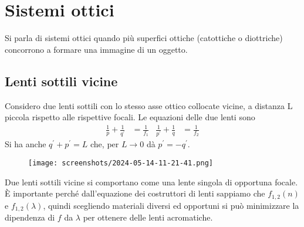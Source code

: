 \section{Sistemi ottici}
Si parla di sistemi ottici quando più superfici ottiche (catottiche o diottriche) concorrono a formare una immagine di un oggetto.

\subsection{Lenti sottili vicine}
Considero due lenti sottili con lo stesso asse ottico collocate vicine, a distanza L piccola rispetto alle rispettive focali. Le equazioni delle due lenti sono
\begin{align}
	\frac{1}{p}+\frac{1}{q^{\prime} } &= \frac{1}{f_1}
	&
	\frac{1}{p^{\prime} } + \frac{1}{q} &= \frac{1}{f_2}
\end{align}
Si ha anche \(q^{\prime} +p^{\prime} =L\) che, per \(L\to 0\) dà \(p^{\prime} = -q^{\prime} \).
\begin{figure}[H]
	\centering
	\texttt{[image: screenshots/2024-05-14-11-21-41.png]}
\end{figure}
Due lenti sottili vicine si comportano come una lente singola di opportuna focale. È importante perché dall'equazione dei costruttori di lenti sappiamo che \(f_{1,2}(n)\) e \(f_{1,2}(\lambda )\), quindi scegliendo materiali diversi ed opportuni si può minimizzare la dipendenza di \(f\) da \(\lambda \) per ottenere delle lenti acromatiche.

